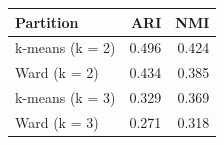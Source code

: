\begin{tabular}{lrr}
\toprule
\textbf{Partition} & \textbf{ARI} & \textbf{NMI} \\
\midrule
k-means (k = 2) & 0.496 & 0.424 \\
Ward (k = 2) & 0.434 & 0.385 \\
k-means (k = 3) & 0.329 & 0.369 \\
Ward (k = 3) & 0.271 & 0.318 \\
\bottomrule
\end{tabular}
